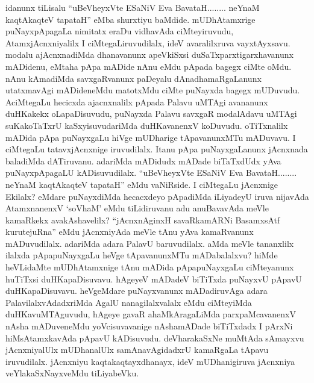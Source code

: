 \begin{artha}
idanunx tiLisalu ``uBeVheyxVte ESaNiV Eva BavataH........ neYnaM kaqtAkaqteV tapataH'' eMba shurxtiyu baMdide. mUDhAtamxrige puNayxpApagaLa nimitatx eraDu vidhavAda ciMteyiruvudu, AtamxjAcnxniyalilx I ciMtegaLiruvudilalx, ideV avaralilxruva vayxtAyxsavu. modalu ajAcnxnadiMda dhanavanunx apeVkiSxsi duSaTxparxtigarxhavanunx mADidenu, eMtaha pApa mADide nAnu eMdu pApada bagegx ciMte oMdu. nAnu kAmadiMda savxgaRvanunx paDeyalu dAnadhamaRgaLanunx utatxmavAgi mADideneMdu matotxMdu ciMte puNayxda bagegx mUDuvudu. AciMtegaLu hecicxda ajacnxnalilx pApada Palavu uMTAgi avananunx duHKakekx oLapaDisuvudu, puNayxda Palavu savxgaR modalAdavu uMTAgi suKakoTaTxrU kaSxyisuvudariMda duHKavanenxV koDuvudu. oTiTxnalilx mADida pApa puNayxgaLu hiVge mUDharige tApavanunxMTu mADuvavu. I ciMtegaLu tatavxjAcnxnige iruvudilalx. Itanu pApa puNayxgaLanunx jAcnxnada baladiMda dATiruvanu. adariMda mADidudx mADade biTaTxdUdx yAva puNayxpApagaLU kADisuvudilalx. ``uBeVheyxVte ESaNiV Eva BavataH........ neYnaM kaqtAkaqteV tapataH'' eMdu vaNiRside. I ciMtegaLu jAcnxnige Ekilalx? eMdare puNayxdiMda hecacxdeyo pApadiMda iLiyadeyU iruva nijavAda AtamxnanenxV `soV\s haM' eMdu tiLidiruvanu adu anuBavavAda meVle kamaRkekx avakAshavelilx? ``jAcnxnAginxH savaRkamARNi BasamxsAtf kurute\s juRna'' eMdu jAcnxniyAda meVle tAnu yAva kamaRvanunx mADuvudilalx. adariMda adara PalavU baruvudilalx. aMda meVle tananxlilx ilalxda pApapuNayxgaLu heVge tApavanunxMTu mADabalalxvu? hiMde heVLidaMte mUDhAtamxnige tAnu mADida pApapuNayxgaLu ciMteyanunx huTiTxsi duHKapaDisuvavu. hAgeyeV mADadeV biTiTxda puNayxvU pApavU duHKapaDisuvavu. heVgeMdare puNayxvanunx mADadiruvAga adara PalavilalxvAdadxriMda AgalU nanagilalxvalalx eMdu ciMteyiMda duHKavuMTAguvudu, hAgeye gavaR ahaMkAragaLiMda parxpaMcavanenxV nAsha mADuveneMdu yoVcisuvavanige nAshamADade biTiTxdadx I pArxNi hiMsAtamxkavAda pApavU kADisuvudu. deVharakaSxNe muMtAda sAmayxvu jAcnxniyalUlx mUDhanalUlx samAnavAgidadxrU kamaRgaLa tApavu iruvudilalx. jAcnxniyu kaqtakaqtayxdhanayx, ideV mUDhanigiruva jAcnxniya veYlakaSxNayxveMdu tiLiyabeVku.
\end{artha}

